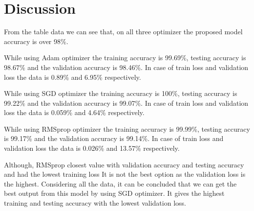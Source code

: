 \documentclass[11pt,a4paper]{article}
\begin{document}
\section{Discussion}
From the table data we can see that, on all three optimizer the proposed model accuracy is over 98\%.

While using Adam optimizer the training accuracy is 99.69\%, testing accuracy is 98.67\% and the validation accuracy is 98.46\%. In case of train loss and validation loss the data is 0.89\% and 6.95\% respectively.


While using SGD optimizer the training accuracy is 100\%, testing accuracy is 99.22\% and the validation accuracy is 99.07\%. In case of train loss and validation loss the data is 0.059\% and 4.64\% respectively.

While using RMSprop optimizer the training accuracy is 99.99\%, testing accuracy is 99.17\% and the validation accuracy is 99.14\%. In case of train loss and validation loss the data is 0.026\% and 13.57\% respectively.

Although, RMSprop closest value with validation accuracy and testing accuracy and had the lowest training loss It is not the best option as the validation loss is the highest. Considering all the data, it can be concluded that we can get the best output from this model by using SGD optimizer. It gives the highest training and testing accuracy with the lowest validation loss. 
\end{document}
